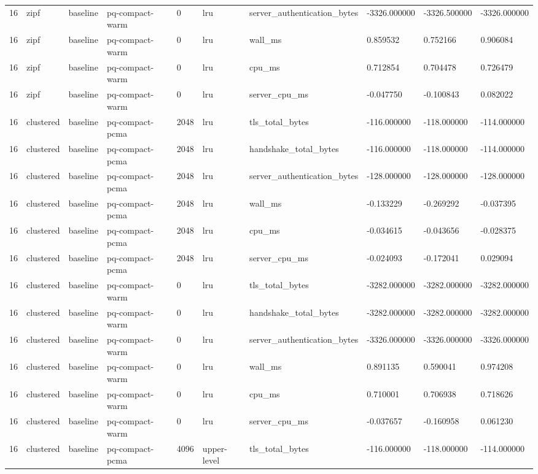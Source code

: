 \begin{tabular}{llllllllll}
16 & zipf & baseline & pq-compact-warm & 0 & lru & server\_authentication\_bytes & -3326.000000 & -3326.500000 & -3326.000000 \\
16 & zipf & baseline & pq-compact-warm & 0 & lru & wall\_ms & 0.859532 & 0.752166 & 0.906084 \\
16 & zipf & baseline & pq-compact-warm & 0 & lru & cpu\_ms & 0.712854 & 0.704478 & 0.726479 \\
16 & zipf & baseline & pq-compact-warm & 0 & lru & server\_cpu\_ms & -0.047750 & -0.100843 & 0.082022 \\
16 & clustered & baseline & pq-compact-pcma & 2048 & lru & tls\_total\_bytes & -116.000000 & -118.000000 & -114.000000 \\
16 & clustered & baseline & pq-compact-pcma & 2048 & lru & handshake\_total\_bytes & -116.000000 & -118.000000 & -114.000000 \\
16 & clustered & baseline & pq-compact-pcma & 2048 & lru & server\_authentication\_bytes & -128.000000 & -128.000000 & -128.000000 \\
16 & clustered & baseline & pq-compact-pcma & 2048 & lru & wall\_ms & -0.133229 & -0.269292 & -0.037395 \\
16 & clustered & baseline & pq-compact-pcma & 2048 & lru & cpu\_ms & -0.034615 & -0.043656 & -0.028375 \\
16 & clustered & baseline & pq-compact-pcma & 2048 & lru & server\_cpu\_ms & -0.024093 & -0.172041 & 0.029094 \\
16 & clustered & baseline & pq-compact-warm & 0 & lru & tls\_total\_bytes & -3282.000000 & -3282.000000 & -3282.000000 \\
16 & clustered & baseline & pq-compact-warm & 0 & lru & handshake\_total\_bytes & -3282.000000 & -3282.000000 & -3282.000000 \\
16 & clustered & baseline & pq-compact-warm & 0 & lru & server\_authentication\_bytes & -3326.000000 & -3326.000000 & -3326.000000 \\
16 & clustered & baseline & pq-compact-warm & 0 & lru & wall\_ms & 0.891135 & 0.590041 & 0.974208 \\
16 & clustered & baseline & pq-compact-warm & 0 & lru & cpu\_ms & 0.710001 & 0.706938 & 0.718626 \\
16 & clustered & baseline & pq-compact-warm & 0 & lru & server\_cpu\_ms & -0.037657 & -0.160958 & 0.061230 \\
16 & clustered & baseline & pq-compact-pcma & 4096 & upper-level & tls\_total\_bytes & -116.000000 & -118.000000 & -114.000000 \\

\end{tabular}
